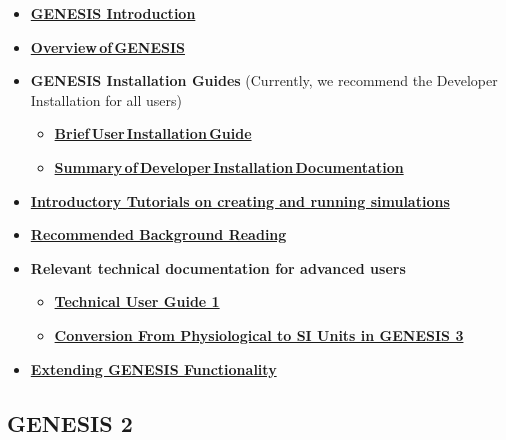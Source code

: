 \documentclass[12pt]{article}
\begin{document}
\begin{itemize}

   \item \href{../genesis-intro/genesis-intro.tex} {\bf GENESIS Introduction}

   \item \href{../genesis-overview/genesis-overview.tex}{\bf Overview\,of\,GENESIS}

   \item {\bf GENESIS Installation Guides} (Currently, we recommend the Developer Installation for all users)

      \begin{itemize}
         \item \href{../installation-debian/installation-debian.tex}{\bf Brief\,User\,Installation\,Guide}
         \item \href{../developer-installation/developer-installation.tex}{\bf Summary\,of\,Developer\,Installation\,Documentation}
      \end{itemize}

   \item \href{../tutorial-genesis/tutorial-genesis.tex} {\bf Introductory
          Tutorials on creating and running simulations}

   \item \href{../background-material/background-material.tex}
          {\bf Recommended Background Reading}

    \item  {\bf Relevant technical documentation for advanced users}
      \begin{itemize}
         \item \href{../technical-guide-1/technical-guide-1.tex}
                {\bf Technical User Guide 1}
         \item \href{../units-conversion/units-conversion.tex}
                {\bf Conversion From Physiological to SI Units in GENESIS 3}
      \end{itemize}

    \item \href{../genesis-extend-functionality/genesis-extend-functionality.tex}
          {\bf Extending GENESIS Functionality}
\end{itemize}

\subsection*{GENESIS 2}
\end{document}
